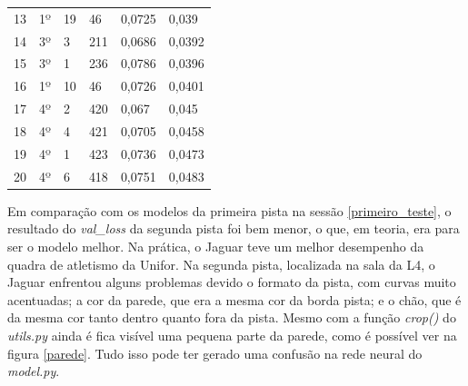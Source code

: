 \begin{table}[H]
\begin{tabular}{|l|l|l|l|l|l|}
13                   & 1º                   & 19             & 46                         & 0,0725                 & 0,039                       \\
14                   & 3º                   & 3              & 211                        & 0,0686                 & 0,0392                      \\
15                   & 3º                   & 1              & 236                        & 0,0786                 & 0,0396                      \\
16                   & 1º                   & 10             & 46                         & 0,0726                 & 0,0401                      \\
17                   & 4º                   & 2              & 420                        & 0,067                  & 0,045                       \\
18                   & 4º                   & 4              & 421                        & 0,0705                 & 0,0458                      \\
19                   & 4º                   & 1              & 423                        & 0,0736                 & 0,0473                      \\
20                   & 4º                   & 6              & 418                        & 0,0751                 & 0,0483 \\ \hline                    
\end{tabular}
\end{table}

Em comparação com os modelos da primeira pista na sessão \ref{primeiro_teste}, o resultado do \textit{val\_loss} da segunda pista foi bem menor, o que, em teoria, era para ser o modelo melhor. Na prática, o Jaguar teve um melhor desempenho da quadra de atletismo da Unifor. Na segunda pista, localizada na sala da L4, o Jaguar enfrentou alguns problemas devido o formato da pista, com curvas muito acentuadas; a cor da parede, que era a mesma cor da borda pista; e o chão, que é da mesma cor tanto dentro quanto fora da pista. Mesmo com a função \textit{crop()} do \textit{utils.py} ainda é fica visível uma pequena parte da parede, como é possível ver na figura \ref{parede}. Tudo isso pode ter gerado uma confusão na rede neural do \textit{model.py}. 

	\begin{figure}[H]
		\centering
\end{figure}

